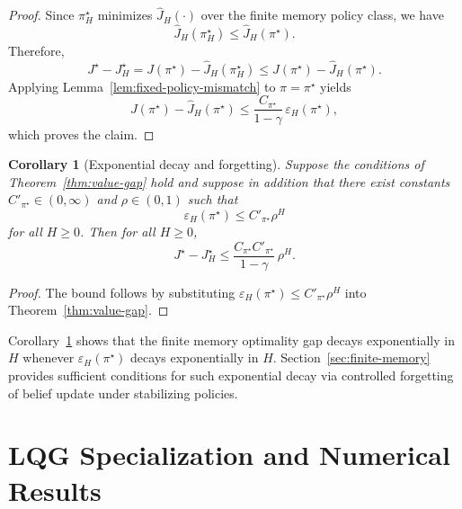 \documentclass[letterpaper, 10 pt, conference]{ieeeconf}
\newtheorem{corollary}{Corollary}
\begin{document}
\begin{proof}
Since $\pi_H^\star$ minimizes $\hat J_H(\cdot)$ over the finite memory policy class, we have
\begin{equation}
\hat J_H(\pi_H^\star)\le \hat J_H(\pi^\star).
\end{equation}
Therefore,
\begin{equation}
J^\star-J_H^\star
=
J(\pi^\star)-\hat J_H(\pi_H^\star)
\le
J(\pi^\star)-\hat J_H(\pi^\star).
\end{equation}
Applying Lemma~\ref{lem:fixed-policy-mismatch} to $\pi=\pi^\star$ yields
\begin{equation}
J(\pi^\star)-\hat J_H(\pi^\star)
\le
\frac{C_{\pi^\star}}{1-\gamma}\,\varepsilon_H(\pi^\star),
\end{equation}
which proves the claim.
\end{proof}

\begin{corollary}[Exponential decay and forgetting]
\label{cor:exp-decay}
Suppose the conditions of Theorem~\ref{thm:value-gap} hold and suppose in addition that there exist constants $C'_{\pi^\star}\in (0, \infty)$ and $\rho\in(0,1)$ such that
\begin{equation}
\varepsilon_H(\pi^\star)\le C'_{\pi^\star}\rho^H
\end{equation}
for all $H\ge 0$.
Then for all $H\ge 0$,
\begin{equation}
J^\star-J_H^\star
\le
\frac{C_{\pi^\star}C'_{\pi^\star}}{1-\gamma}\,\rho^H.
\end{equation}
\end{corollary}

\begin{proof}
The bound follows by substituting $\varepsilon_H(\pi^\star)\le C'_{\pi^\star}\rho^H$ into Theorem~\ref{thm:value-gap}.
\end{proof}

Corollary~\ref{cor:exp-decay} shows that the finite memory optimality gap decays exponentially in $H$ whenever $\varepsilon_H(\pi^\star)$ decays exponentially in $H$.
Section~\ref{sec:finite-memory} provides sufficient conditions for such exponential decay via controlled forgetting of belief update under stabilizing policies.




\section{LQG Specialization and Numerical Results}
\label{sec:lqg}
\end{document}
